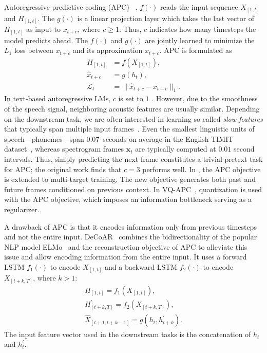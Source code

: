 Autoregressive predictive coding (APC)~\cite{chung_unsupervised_2019,
chung_generative_2020} .
 $f(\cdot)$ reads the input sequence $X_{[1,t]}$ and  $H_{[1,t]}$.
The  $g(\cdot)$ is a linear projection layer which takes the last vector of $H_{[1,t]}$ as input to  $x_{t+c}$, where $c \geq 1$. Thus, $c$ indicates how many timesteps the model predicts ahead. The  $f(\cdot)$
and $g(\cdot)$ are jointly learned to minimize {the \ensuremath{L_1} loss between $x_{t+c}$ and its approximation $\hat{x}_{t+c}$}. APC is formulated as 
\begin{align}
    H_{[1,t]} &= f(X_{[1,t]}) , \\
    \hat{x}_{t+c} &= g(h_{t}) \label{eq:c} , \\
    \mathcal{L}_t &= \lVert \hat{x}_{t+c} - x_{t+c} \rVert_1 .
\end{align}
In text-based autoregressive LMs, $c$ is set to $1$ . However, due to the smoothness of the speech signal, neighboring acoustic features are usually similar. Depending on the downstream task, we are often interested in learning so-called \emph{slow features} that typically span multiple input frames~\cite{wiskott_slow_2002}. Even the smallest linguistic units of speech---phonemes---span $0.07$~seconds on average in the English TIMIT dataset~\cite{garofolo_timit_1993},   whereas spectrogram frames $\mathbf{x}_t$ are typically computed at $0.01$ second intervals. Thus, simply predicting the next frame constitutes a trivial pretext task for APC; the original work finds that $c=3$ performs well. 
In \cite{chung_improved_2020}, the APC objective is extended to multi-target
training. The new objective generates both past and future frames conditioned
on previous context. 
In VQ-APC~\cite{chung_vector-quantized_2020}, quantization is used with the APC
objective, which imposes an information bottleneck serving as a regularizer.

A drawback of APC is that it encodes information only from previous timesteps
and not the entire input.
DeCoAR~\cite{ling_deep_2020} combines the bidirectionality of the popular NLP model
ELMo~\cite{peters_deep_2018} and the reconstruction objective of APC to alleviate
this issue and allow encoding information from the entire input. 
It uses a forward LSTM $f_1(\cdot)$ to encode $X_{[1,t]}$ and a backward LSTM
$f_2(\cdot)$ to encode $X_{[t+k,T]}$, where $k>1$: 
\begin{gather}
    H_{[1,t]} = f_1(X_{[1,t]}), \\
    H^\prime_{[t+k,T]} = f_2(X_{[t+k,T]}), \\
    \hat{X}_{[t+1,t+k-1]} = g(h_t, h^\prime_{t+k}).
\end{gather}
The input feature vector used in the downstream tasks is the concatenation of
$h_{t}$ and $h^\prime_{t}$. 


